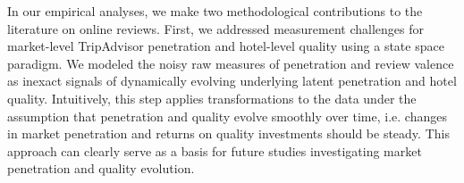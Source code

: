 \documentclass[mksc,blindrev]{informs3} %
\begin{document}


In our empirical analyses, we make two methodological contributions to the literature on online reviews. First, we addressed measurement challenges for market-level TripAdvisor penetration and hotel-level quality using a state space paradigm. We modeled the noisy raw measures of penetration and review valence as inexact signals of dynamically evolving underlying latent penetration and hotel quality. Intuitively, this step applies transformations to the data under the assumption that penetration and quality evolve smoothly over time, i.e. changes in market penetration and returns on quality investments should be steady. This approach can clearly serve as a basis for future studies investigating market penetration and quality evolution.
\end{document}
